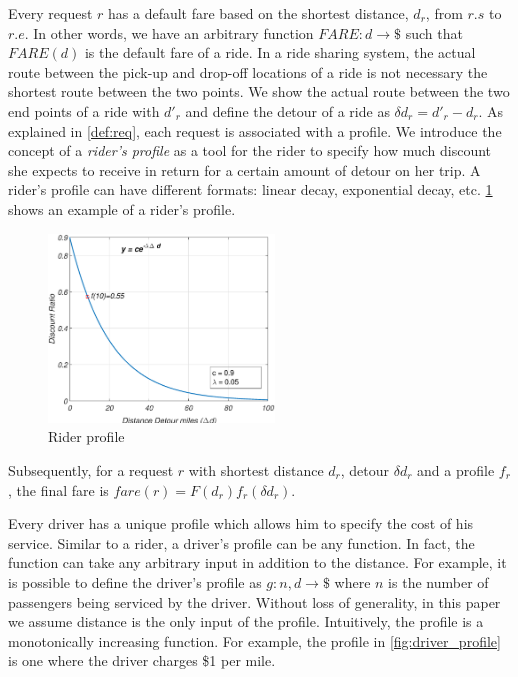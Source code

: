 Every request $r$ has a default fare based on the shortest distance, $d_r$, from $r.s$ to $r.e$. In other words, we have an arbitrary function $FARE: d \rightarrow \$ $ such that $FARE(d)$ is the default fare of a ride. In a ride sharing system, the actual route between the pick-up and drop-off locations of a ride is not necessary the shortest route between the two points. We show the actual route between the two end points of a ride with $d'_r$ and define the detour of a ride as $\delta d_r = d'_r - d_r$. As explained in \cref{def:req}, each request is associated with a profile. We introduce the concept of a \textit{rider's profile} as a tool for the rider to specify how much discount she expects to receive in return for a certain amount of detour on her trip. A rider's profile can have different formats: linear decay, exponential decay, etc. \cref{fig:rider_profile} shows an example of a rider's profile.

\begin{figure}[!ht]
	\centering
	\includegraphics[width = 60mm]{fig/rider.eps}
	\vspace{-0mm}\caption{Rider profile} \vspace{-2mm} \label{fig:rider_profile}
\end{figure}\vspace{-0mm}

Subsequently, for a request $r$ with shortest distance $d_r$, detour $\delta d_r$ and a profile $f_r$, the final fare is $fare(r) = F(d_r) f_r(\delta d_r)$.

Every driver has a unique profile which allows him to specify the cost of his service. Similar to a rider, a driver's profile can be any function. In fact, the function can take any arbitrary input in addition to the distance. For example, it is possible to define the driver's profile as $g: n, d \rightarrow \$$ where $n$ is the number of passengers being serviced by the driver. Without loss of generality, in this paper we assume distance is the only input of the profile. Intuitively, the profile is a monotonically increasing function. For example, the profile in \cref{fig:driver_profile} is one where the driver charges \$1 per mile.

